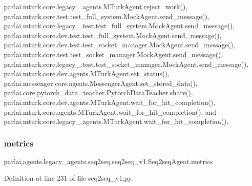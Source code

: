 parlai.\+mturk.\+core.\+legacy\+\_.\+agents.\+M\+Turk\+Agent.\+reject\+\_\+work(), parlai.\+mturk.\+core.\+test.\+test\+\_\+full\+\_\+system.\+Mock\+Agent.\+send\+\_\+message(), parlai.\+mturk.\+core.\+legacy\+\_.\+test.\+test\+\_\+full\+\_\+system.\+Mock\+Agent.\+send\+\_\+message(), parlai.\+mturk.\+core.\+dev.\+test.\+test\+\_\+full\+\_\+system.\+Mock\+Agent.\+send\+\_\+message(), parlai.\+mturk.\+core.\+dev.\+test.\+test\+\_\+socket\+\_\+manager.\+Mock\+Agent.\+send\+\_\+message(), parlai.\+mturk.\+core.\+test.\+test\+\_\+socket\+\_\+manager.\+Mock\+Agent.\+send\+\_\+message(), parlai.\+mturk.\+core.\+legacy\+\_.\+test.\+test\+\_\+socket\+\_\+manager.\+Mock\+Agent.\+send\+\_\+message(), parlai.\+mturk.\+core.\+dev.\+agents.\+M\+Turk\+Agent.\+set\+\_\+status(), parlai.\+messenger.\+core.\+agents.\+Messenger\+Agent.\+set\+\_\+stored\+\_\+data(), parlai.\+core.\+pytorch\+\_\+data\+\_\+teacher.\+Pytorch\+Data\+Teacher.\+share(), parlai.\+mturk.\+core.\+dev.\+agents.\+M\+Turk\+Agent.\+wait\+\_\+for\+\_\+hit\+\_\+completion(), parlai.\+mturk.\+core.\+agents.\+M\+Turk\+Agent.\+wait\+\_\+for\+\_\+hit\+\_\+completion(), and parlai.\+mturk.\+core.\+legacy\+\_.\+agents.\+M\+Turk\+Agent.\+wait\+\_\+for\+\_\+hit\+\_\+completion().

\mbox{\label{classparlai_1_1agents_1_1legacy__agents_1_1seq2seq_1_1seq2seq__v1_1_1Seq2seqAgent_a640b76ddf76c70e73c4012f37d4c72b7}} 
\subsubsection{\texorpdfstring{metrics}{metrics}}
{\footnotesize\ttfamily parlai.\+agents.\+legacy\+\_\+agents.\+seq2seq.\+seq2seq\+\_\+v1.\+Seq2seq\+Agent.\+metrics}



Definition at line 231 of file seq2seq\+\_\+v1.\+py.



